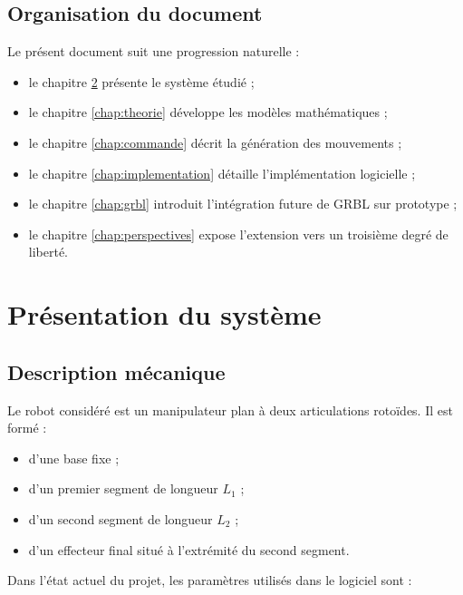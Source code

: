 \documentclass[12pt,a4paper]{report}
\newcommand{\Lone}{L_1}
\newcommand{\Ltwo}{L_2}
\begin{document}
\section{Organisation du document}

Le présent document suit une progression naturelle :

\begin{itemize}
    \item le chapitre \ref{chap:systeme} présente le système étudié ;
    \item le chapitre \ref{chap:theorie} développe les modèles mathématiques ;
    \item le chapitre \ref{chap:commande} décrit la génération des mouvements ;
    \item le chapitre \ref{chap:implementation} détaille l'implémentation logicielle ;
    \item le chapitre \ref{chap:grbl} introduit l'intégration future de GRBL sur prototype ;
    \item le chapitre \ref{chap:perspectives} expose l'extension vers un troisième degré de liberté.
\end{itemize}

\chapter{Présentation du système}\label{chap:systeme}

\section{Description mécanique}

Le robot considéré est un manipulateur plan à deux articulations rotoïdes. Il est formé :

\begin{itemize}
    \item d'une base fixe ;
    \item d'un premier segment de longueur $\Lone$ ;
    \item d'un second segment de longueur $\Ltwo$ ;
    \item d'un effecteur final situé à l'extrémité du second segment.
\end{itemize}

Dans l'état actuel du projet, les paramètres utilisés dans le logiciel sont :
\end{document}
